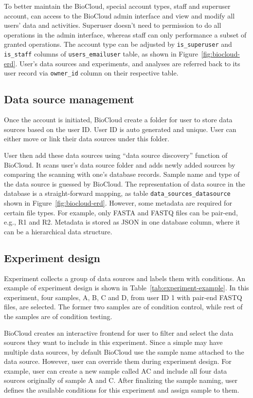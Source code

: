 To better maintain the BioCloud, special account types, staff and superuser
account, can access to the BioCloud admin interface and view and modify all
users' data and activities. Superuser doesn't need to permission to do all
operations in the admin interface, whereas staff can only performance a subset
of granted operations. The account type can be adjusted by
\texttt{is\_superuser} and \texttt{is\_staff} columns of
\texttt{users\_emailuser} table, as shown in Figure~\ref{fig:biocloud-erd}.
User's data sources and experiments, and analyses are referred back to its user
record via \texttt{owner\_id} column on their respective table.


\subsection{Data source management}

Once the account is initiated, BioCloud create a folder for user to store
data sources based on the user ID. User ID is auto generated and unique. User
can either move or link their data sources under this folder.

User then add these data sources using ``data source discovery'' function of
BioCloud. It scans user's data source folder and adds newly added sources by
comparing the scanning with one's database records. Sample name and type of the
data source is guessed by BioCloud. The representation of data source in the
database is a straight-forward mapping, as table
\texttt{data\_sources\_datasource} shown in Figure~\ref{fig:biocloud-erd}.
However, some metadata are required for certain file types. For example, only
FASTA and FASTQ files can be pair-end, e.g., R1 and R2. Metadata is stored as
JSON in one database column, where it can be a hierarchical data structure.


\subsection{Experiment design}

Experiment collects a group of data sources and labels them with conditions. An
example of experiment design is shown in Table~\ref{tab:experiment-example}. In
this experiment, four samples, A, B, C and D, from user ID 1 with pair-end
FASTQ files, are selected. The former two samples are of condition control,
while rest of the samples are of condition testing.



BioCloud creates an interactive frontend for user to filter and select the data
sources they want to include in this experiment. Since a simple may have
multiple data sources, by default BioCloud use the sample name attached to the
data source. However, user can override them during experiment design. For
example, user can create a new sample called AC and include all four data
sources originally of sample A and C. After finalizing the sample naming, user
defines the available conditions for this experiment and assign sample to them.

